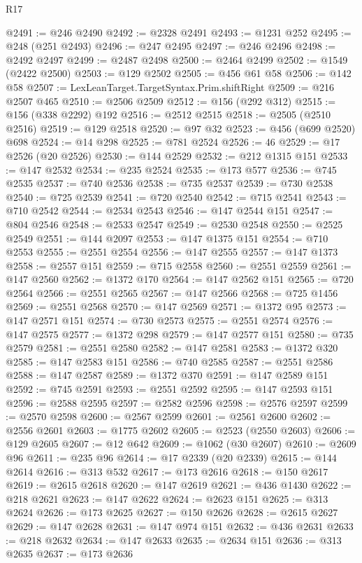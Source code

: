\begin{lexlean}{R17}
\begin{coremodule}
@2491 := @246 @2490
@2492 := @2328 @2491
@2493 := @1231 @252
@2495 := @248 (@251 @2493)
@2496 := @247 @2495
@2497 := @246 @2496
@2498 := @2492 @2497
@2499 := @2487 @2498
@2500 := @2464 @2499
@2502 := @1549 (@2422 @2500)
@2503 := @129 @2502
@2505 := @456 @61 @58
@2506 := @142 @58
@2507 := LexLeanTarget.TargetSyntax.Prim.shiftRight
@2509 := @216 @2507 @465
@2510 := @2506 @2509
@2512 := @156 (@292 @312)
@2515 := @156 (@338 @2292) @192
@2516 := @2512 @2515
@2518 := @2505 (@2510 @2516)
@2519 := @129 @2518
@2520 := @97 @32
@2523 := @456 (@699 @2520) @698
@2524 := @14 @298
@2525 := @781 @2524
@2526 := 46
@2529 := @17 @2526 (@20 @2526)
@2530 := @144 @2529
@2532 := @212 @1315 @151
@2533 := @147 @2532
@2534 := @235 @2524
@2535 := @173 @577
@2536 := @745 @2535
@2537 := @740 @2536
@2538 := @735 @2537
@2539 := @730 @2538
@2540 := @725 @2539
@2541 := @720 @2540
@2542 := @715 @2541
@2543 := @710 @2542
@2544 := @2534 @2543
@2546 := @147 @2544 @151
@2547 := @804 @2546
@2548 := @2533 @2547
@2549 := @2530 @2548
@2550 := @2525 @2549
@2551 := @144 @2097
@2553 := @147 @1375 @151
@2554 := @710 @2553
@2555 := @2551 @2554
@2556 := @147 @2555
@2557 := @147 @1373
@2558 := @2557 @151
@2559 := @715 @2558
@2560 := @2551 @2559
@2561 := @147 @2560
@2562 := @1372 @170
@2564 := @147 @2562 @151
@2565 := @720 @2564
@2566 := @2551 @2565
@2567 := @147 @2566
@2568 := @725 @1456
@2569 := @2551 @2568
@2570 := @147 @2569
@2571 := @1372 @95
@2573 := @147 @2571 @151
@2574 := @730 @2573
@2575 := @2551 @2574
@2576 := @147 @2575
@2577 := @1372 @298
@2579 := @147 @2577 @151
@2580 := @735 @2579
@2581 := @2551 @2580
@2582 := @147 @2581
@2583 := @1372 @320
@2585 := @147 @2583 @151
@2586 := @740 @2585
@2587 := @2551 @2586
@2588 := @147 @2587
@2589 := @1372 @370
@2591 := @147 @2589 @151
@2592 := @745 @2591
@2593 := @2551 @2592
@2595 := @147 @2593 @151
@2596 := @2588 @2595
@2597 := @2582 @2596
@2598 := @2576 @2597
@2599 := @2570 @2598
@2600 := @2567 @2599
@2601 := @2561 @2600
@2602 := @2556 @2601
@2603 := @1775 @2602
@2605 := @2523 (@2550 @2603)
@2606 := @129 @2605
@2607 := @12 @642
@2609 := @1062 (@30 @2607)
@2610 := @2609 @96
@2611 := @235 @96
@2614 := @17 @2339 (@20 @2339)
@2615 := @144 @2614
@2616 := @313 @532
@2617 := @173 @2616
@2618 := @150 @2617
@2619 := @2615 @2618
@2620 := @147 @2619
@2621 := @436 @1430
@2622 := @218 @2621
@2623 := @147 @2622
@2624 := @2623 @151
@2625 := @313 @2624
@2626 := @173 @2625
@2627 := @150 @2626
@2628 := @2615 @2627
@2629 := @147 @2628
@2631 := @147 @974 @151
@2632 := @436 @2631
@2633 := @218 @2632
@2634 := @147 @2633
@2635 := @2634 @151
@2636 := @313 @2635
@2637 := @173 @2636

\end{coremodule}
\end{lexlean}
